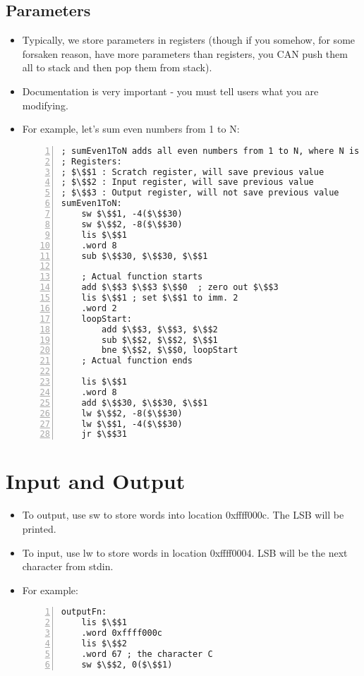 \documentclass[12pt]{article}
\begin{document}
\subsection{Parameters}
\begin{itemize}
    \item Typically, we store parameters in registers (though if you somehow, for some forsaken reason, have more parameters than registers, you CAN push them all to stack and then pop them from stack).
    \item Documentation is very important - you must tell users what you are modifying.
    \item For example, let's sum even numbers from 1 to N:
        \begin{lstlisting}[mathescape, numbers=left, breaklines=true]
; sumEven1ToN adds all even numbers from 1 to N, where N is even
; Registers:
; $\$$1 : Scratch register, will save previous value
; $\$$2 : Input register, will save previous value
; $\$$3 : Output register, will not save previous value
sumEven1ToN:
    sw $\$$1, -4($\$$30)
    sw $\$$2, -8($\$$30)
    lis $\$$1
    .word 8
    sub $\$$30, $\$$30, $\$$1

    ; Actual function starts
    add $\$$3 $\$$3 $\$$0  ; zero out $\$$3
    lis $\$$1 ; set $\$$1 to imm. 2
    .word 2
    loopStart:
        add $\$$3, $\$$3, $\$$2
        sub $\$$2, $\$$2, $\$$1
        bne $\$$2, $\$$0, loopStart
    ; Actual function ends

    lis $\$$1
    .word 8
    add $\$$30, $\$$30, $\$$1
    lw $\$$2, -8($\$$30)
    lw $\$$1, -4($\$$30)
    jr $\$$31
        \end{lstlisting} 
\end{itemize}

\section{Input and Output} 
\begin{itemize}
    \item To output, use sw to store words into location 0xffff000c.  The LSB will be printed.
    \item To input, use lw to store words in location 0xffff0004.  LSB will be the next character from stdin.
    \item For example:
        \begin{lstlisting}[mathescape, numbers=left, breaklines=true]
outputFn:
    lis $\$$1
    .word 0xffff000c
    lis $\$$2
    .word 67 ; the character C
    sw $\$$2, 0($\$$1)
        \end{lstlisting} 
\end{itemize}
\end{document}
